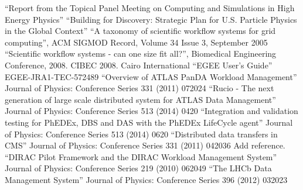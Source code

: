 \begin{thebibliography}{99}
 ``Report from the Topical Panel Meeting on Computing and
Simulations in High Energy Physics''
 ``Building for Discovery: Strategic Plan for U.S. Particle Physics in the Global Context''
 ``A taxonomy of scientific workflow systems for grid computing'', ACM SIGMOD Record, Volume 34 Issue 3, September 2005
 ``Scientific workflow systems - can one size fit all?'', Biomedical Engineering Conference, 2008. CIBEC 2008. Cairo International
 ``EGEE User’s Guide'' EGEE-JRA1-TEC-572489
 ``Overview of ATLAS PanDA Workload Management'' Journal of Physics: Conference Series 331 (2011) 072024
 ``Rucio - The next generation of large scale distributed system for ATLAS Data Management'' Journal of Physics: Conference Series 513 (2014) 0420
 ``Integration and validation testing for PhEDEx, DBS and DAS with the PhEDEx LifeCycle agent'' Journal of Physics: Conference Series 513 (2014) 0620
 ``Distributed data transfers in CMS'' Journal of Physics: Conference Series 331 (2011) 042036
 Add reference.
 ``DIRAC Pilot Framework and the DIRAC Workload Management System'' Journal of Physics: Conference Series 219 (2010) 062049
 ``The LHCb Data Management System'' Journal of Physics: Conference Series 396 (2012) 032023
\end{thebibliography}
